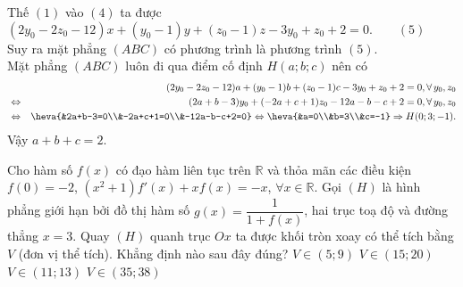 \begin{ex}
{		Thế $(1)$ vào $(4)$ ta được
		$(2y_0-2z_0-12)x+(y_0-1)y+(z_0-1)z-3y_0+z_0+2=0.\qquad (5)$\\
		Suy ra mặt phẳng $(ABC)$ có phương trình là phương trình $(5)$.\\
		Mặt phẳng $(ABC)$ luôn đi qua điểm cố định $H(a;b;c)$ nên có
		\allowdisplaybreaks
		\begin{eqnarray*}
			&&(2y_0-2z_0-12)a+(y_0-1)b+(z_0-1)c-3y_0+z_0+2=0,\forall \,y_0,z_0\\
			&\Leftrightarrow&(2a+b-3)y_0+(-2a+c+1)z_0-12a-b-c+2=0,\forall \,y_0,z_0\\
			&\Leftrightarrow&\heva{&2a+b-3=0\\&-2a+c+1=0\\&-12a-b-c+2=0}\Leftrightarrow\heva{&a=0\\&b=3\\&c=-1}\Rightarrow H(0;3;-1).
		\end{eqnarray*}
		Vậy $a+b+c=2$.
	}
\end{ex}

\begin{ex}%
	Cho hàm số $f(x)$ có đạo hàm liên tục trên $\mathbb{R}$ và thỏa mãn các điều kiện $f(0)=-2$, $\left(x^2+1\right){f}'(x)+xf(x)=-x$, $\forall x\in\mathbb{R}$. Gọi $(H)$ là hình phẳng giới hạn bởi đồ thị hàm số $g(x)=\dfrac{1}{1+f(x)}$, hai trục toạ độ và đường thẳng $ x=3$. Quay $(H)$ quanh trục $Ox$ ta được khối tròn xoay có thể tích bằng $V$ (đơn vị thể tích). Khẳng định nào sau đây đúng?
	\choice
	{$ V\in\left(5;9\right)$}
	{$ V\in\left(15;20\right)$}
	{$ V\in\left(11;13\right)$}
	{\True $ V\in\left(35;38\right)$}
\end{ex}

